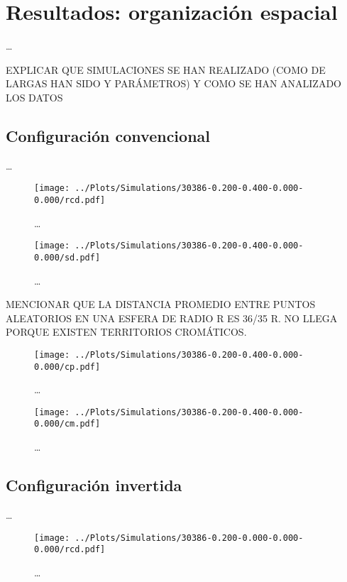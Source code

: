 \chapter{Resultados: organización espacial}
\label{cap:results}

\dots

EXPLICAR QUE SIMULACIONES SE HAN REALIZADO (COMO DE LARGAS HAN SIDO Y PARÁMETROS) Y COMO SE HAN ANALIZADO LOS DATOS

\section{Configuración convencional}

\dots

\begin{figure}
  \centering
  \texttt{[image: ../Plots/Simulations/30386-0.200-0.400-0.000-0.000/rcd.pdf]}
  \caption{\dots}
  \label{fig:rcd_c}
\end{figure}

\begin{figure}
  \centering
  \texttt{[image: ../Plots/Simulations/30386-0.200-0.400-0.000-0.000/sd.pdf]}
  \caption{\dots}
  \label{fig:sd_c}
\end{figure}

MENCIONAR QUE LA DISTANCIA PROMEDIO ENTRE PUNTOS ALEATORIOS EN UNA ESFERA DE RADIO R ES 36/35 R. NO LLEGA PORQUE EXISTEN TERRITORIOS CROMÁTICOS.

\begin{figure}
  \centering
  \texttt{[image: ../Plots/Simulations/30386-0.200-0.400-0.000-0.000/cp.pdf]}
  \caption{\dots}
  \label{fig:cp_c}
\end{figure}

\begin{figure}
  \centering
  \texttt{[image: ../Plots/Simulations/30386-0.200-0.400-0.000-0.000/cm.pdf]}
  \caption{\dots}
  \label{fig:cm_c}
\end{figure}

\section{Configuración invertida}

\dots

\begin{figure}
  \centering
  \texttt{[image: ../Plots/Simulations/30386-0.200-0.000-0.000-0.000/rcd.pdf]}
  \caption{\dots}
  \label{fig:rcd_i}
\end{figure}

